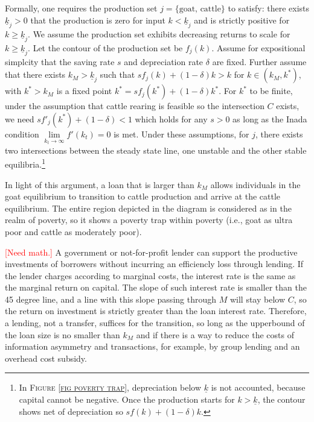 	Formally, one requires the production set $j=\{\mbox{goat, cattle}\}$ to satisfy: there exists $\underline{k}_{j}>0$ that the production is zero for input $k<\underline{k}_{j}$ and is strictly positive for $k\geqslant\underline{k}_{j}$. We assume the production set exhibits decreasing returns to scale for $k\geqslant\underline{k}_{j}$. Let the contour of the production set be $f_{j}(k)$. Assume for expositional simplcity that the saving rate $s$ and depreciation rate $\delta$ are fixed. Further assume that there exists $k_{M}>\underline{k}_{j}$ such that $sf_{j}(k)+(1-\delta)k>k$ for $k\in(k_{M}, k^{*})$, with $k^{*}>k_{M}$ is a fixed point $k^{*}=sf_{j}(k^{*})+(1-\delta)k^{*}$. For $k^{*}$ to be finite, under the assumption that cattle rearing is feasible so the intersection $C$ exists, we need $sf'_{j}(k^{*})+(1-\delta)<1$ which holds for any $s>0$ as long as the Inada condition $\lim\limits_{k_{t}\rightarrow \infty} f'(k_{t})=0$ is met. Under these assumptions, for $j$, there exists two intersections between the steady state line, one unstable and the other stable equilibria.\footnote{In \textsc{Figure \ref{fig poverty trap}}, depreciation below $\underline{k}$ is not accounted, because capital cannot be negative. Once the production starts for $k>\underline{k}$, the contour shows net of depreciation so $sf(k)+(1-\delta)k$. } 

	In light of this argument, a loan that is larger than $k_{M}$ allows individuals in the goat equilibrium to transition to cattle production and arrive at the cattle equilibrium. The entire region depicted in the diagram is considered as in the realm of poverty, so it shows a poverty trap within poverty (i.e., goat as ultra poor and cattle as moderately poor). 

	\textcolor{red}{[Need math.]} A government or not-for-profit lender can support the productive investments of borrowers without incurring an efficiencly loss through lending. If the lender charges according to marginal costs, the interest rate is the same as the marginal return on capital. The slope of such interest rate is smaller than the 45 degree line, and a line with this slope passing through $M$ will stay below $C$, so the return on investment is strictly greater than the loan interest rate. Therefore, a lending, not a transfer, suffices for the transition, so long as the upperbound of the loan size is no smaller than $k_{M}$ and if there is a way to reduce the costs of information asymmetry and transactions, for example, by group lending and an overhead cost subsidy.

